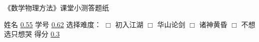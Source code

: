 \documentclass[CJK]{article}
\begin{document}
\bch
\bcenter

《数学物理方法》课堂小测答题纸

{\vskip 0.07in}

姓名 \uline{0.55} {\hskip 0.1in} 学号 \uline{0.62} {\hskip 0.1in} 选择难度： $\Box$ 初入江湖 $\Box$ 华山论剑 $\Box$ 诸神黄昏 $\Box$ 不想选只想哭 {\hskip 0.1in} 得分 \uline{0.3}

{\vskip 0.07in}




\ecenter


\ech
\end{document}
